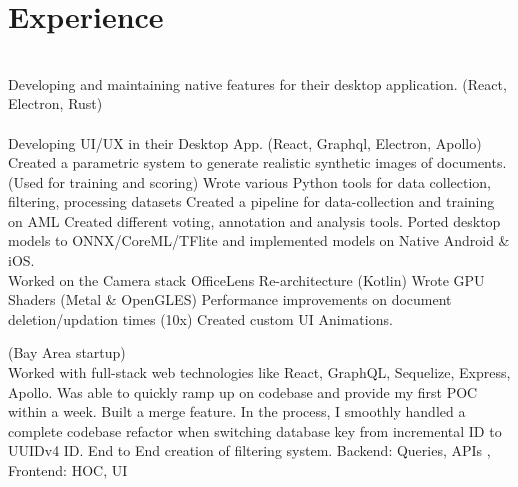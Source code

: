 \documentclass[]{deedy-resume-openfont}
\begin{document}
\begin{minipage}[t]{0.66\textwidth} 


\section{Experience}
\\
Developing and maintaining native features for their desktop application. (React, Electron, Rust)\\
\sectionsep
{}\\
Developing UI/UX in their Desktop App. (React, Graphql, Electron, Apollo)\\
\textbullet Created a parametric system to generate realistic synthetic images of documents. (Used for training and scoring)
\textbullet Wrote various Python tools for data collection, filtering, processing datasets \textbullet Created a pipeline for data-collection and training on AML \textbullet Created different voting, annotation and analysis tools.  \textbullet Ported desktop models to ONNX/CoreML/TFlite and implemented models on Native Android \& iOS. \\
\textbullet  Worked on the Camera stack \textbullet  OfficeLens Re-architecture (Kotlin) \textbullet  Wrote GPU Shaders (Metal \& OpenGLES) \textbullet  Performance improvements on document deletion/updation times (10x)
\textbullet Created custom UI Animations.
\sectionsep

 (Bay Area startup) \\
Worked with full-stack web technologies like React, GraphQL, Sequelize, Express, Apollo. \textbullet Was able to quickly ramp up on codebase and provide my first POC within a week.
\textbullet Built a merge feature. In the process, I smoothly handled a complete codebase refactor when switching database key from incremental ID to UUIDv4 ID.
\textbullet End to End creation of filtering system. Backend: Queries, APIs , Frontend: HOC, UI


\end{minipage}
\end{document}
